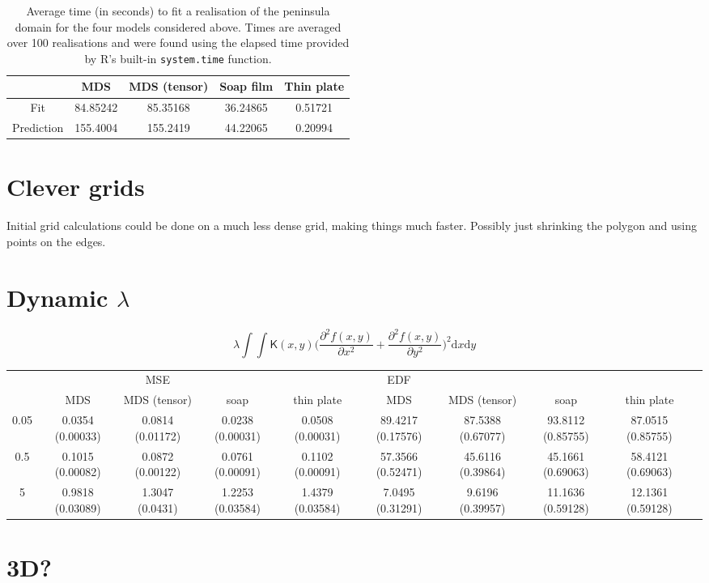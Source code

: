 \documentclass[a4paper,10pt]{article}
\begin{document}
\begin{table}[ht]
\centering
\begin{tabular}{c || c c c c}
 & MDS & MDS (tensor) & Soap film & Thin plate\\ 
\hline
Fit & 84.85242 & 85.35168 & 36.24865 & 0.51721\\
Prediction & 155.4004 & 155.2419 & 44.22065 & 0.20994 \\
\end{tabular}
\label{wt2time}
\caption{Average time (in seconds) to fit a realisation of the peninsula domain for the four models considered above. Times are averaged over 100 realisations and were found using the elapsed time provided by \textsf{R}'s built-in \texttt{system.time} function.}
\end{table}






\section{Clever grids}

Initial grid calculations could be done on a much less dense grid, making things much faster. Possibly just shrinking the polygon and using points on the edges.



\section{Dynamic $\lambda$}


\begin{equation}
\lambda \int\int \mathsf{K}(x,y) \Big(\frac{\partial^2 f(x,y)}{\partial x^2} + \frac{\partial^2 f(x,y)}{\partial y^2}\Big)^2 \text{d}x\text{d}y
\end{equation}


\begin{table}[ht]
\centering
\begin{tabular}{c c c c c c c c c c}
 & & MSE & &  & EDF & \\ 
 & MDS & MDS (tensor) & soap & thin plate & MDS & MDS (tensor) & soap & thin plate\\ 
0.05  & 0.0354 (0.00033) & 0.0814 (0.01172) & 0.0238 (0.00031) &0.0508 (0.00031) &89.4217 (0.17576) & 87.5388 (0.67077) & 93.8112 (0.85755) & 87.0515 (0.85755)\\ 
0.5  & 0.1015 (0.00082) & 0.0872 (0.00122) & 0.0761 (0.00091) &0.1102 (0.00091) &57.3566 (0.52471) & 45.6116 (0.39864) & 45.1661 (0.69063) & 58.4121 (0.69063)\\ 
5  & 0.9818 (0.03089) & 1.3047 (0.0431) & 1.2253 (0.03584) &1.4379 (0.03584) &7.0495 (0.31291) & 9.6196 (0.39957) & 11.1636 (0.59128) & 12.1361 (0.59128)\\ 
\end{tabular}
\end{table}


\section{3D?}



\end{document}
